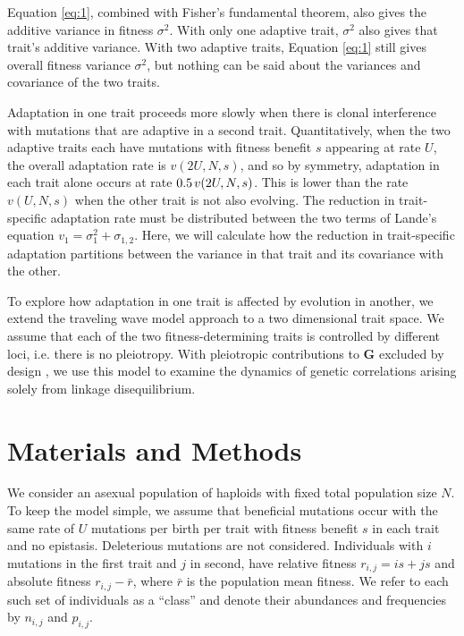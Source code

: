 \documentclass[9pt,twocolumn,twoside]{gsajnl}
\newcommand{\G}{\textbf{G }}
\begin{document}
Equation \ref{eq:1}, combined with Fisher's fundamental theorem, also gives the additive variance in fitness $\sigma^2$. With only one adaptive trait,  $\sigma^2$ also gives that trait's additive variance. With two adaptive traits, Equation \ref{eq:1} still gives overall fitness variance $\sigma^2$, but nothing can be said about the variances and covariance of the two traits.\par 

Adaptation in one trait proceeds more slowly when there is clonal interference with mutations that are adaptive in a second trait. Quantitatively, when the two adaptive traits each have mutations with fitness benefit $s$ appearing at rate $U$, the overall adaptation rate is $v(2U,N,s)$, and so by symmetry, adaptation in each trait alone occurs at rate $0.5 \hspace{.02 in} v(2U,N,s)$. This is lower than the rate $v(U,N,s)$ when the other trait is not also evolving. The reduction in trait-specific adaptation rate must be distributed between the two terms of Lande's equation $v_1 =\sigma_1^2 +\sigma_{1,2}$. Here, we will calculate how the reduction in trait-specific adaptation partitions between the variance in that trait and its covariance with the other.\par

% 
% 
% 

To explore how adaptation in one trait is affected by evolution in another, we extend the traveling wave model approach to a two dimensional trait space. We assume that each of the two fitness-determining traits is controlled by different loci, i.e. there is no pleiotropy. With pleiotropic contributions to \G excluded by design , we use this model to examine the dynamics of genetic correlations arising solely from linkage disequilibrium. 

\section{Materials and Methods}
\label{sec:materials:methods}

We consider an asexual population of haploids with fixed total population size $N$. To keep the model simple, we assume that beneficial mutations occur with the same rate of $U$ mutations per birth per trait with fitness benefit $s$ in each trait and no epistasis. Deleterious mutations are not considered. Individuals with $i$ mutations in the first trait and $j$ in second, have relative fitness $r_{i,j}= i s+j s$ and absolute fitness $r_{i,j}-\bar{r}$, where $\bar{r}$ is the population mean fitness. We refer to each such set of individuals as a ``class'' and denote their abundances and frequencies by $n_{i,j}$ and $p_{i,j}$. \par 
\end{document}

